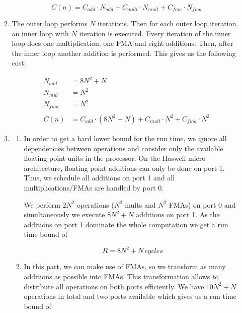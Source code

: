 \documentclass[a4paper]{article}
\begin{document}
\begin{enumerate}
\begin{enumerate}
        \begin{equation*}
        C(n) = C_{add} \cdot N_{add} + C_{mult} \cdot N_{mult} + C_{fma} \cdot N_{fma}
        \end{equation*}
        
        \item The outer loop performs $N$ iterations. Then for each outer loop iteration, an inner loop with $N$ iteration is executed. Every iteration of the inner loop does one multiplication, one FMA and eight additions. Then, after the inner loop another addition is performed. This gives us the following cost:
        
        \begin{align*}
            N_{add} &= 8N^2 + N \\
            N_{mul} &= N^2 \\
            N_{fma} &= N^2 \\ \\
            C(n) &= C_{add} \cdot (8N^2 + N) + C_{mult} \cdot N^2 + C_{fma} \cdot N^2
        \end{align*}
        
        \item 
        \begin{enumerate}
            \item In order to get a hard lower bound for the run time, we ignore all dependencies between operations and consider only the available floating point units in the processor. On the Haswell micro architecture, floating point additions can only be done on port 1. Thus, we schedule all additions on port 1 and all multiplications/FMAs are handled by port 0. 
            
            We perform $2N^2$ operations ($N^2$ mults and $N^2$ FMAs) on port 0 and simultaneously we execute $8N^2+N$ additions on port 1. As the additions on port 1 dominate the whole computation we get a run time bound of
            
            \begin{equation*}
                R = 8N^2+N \, cycles
            \end{equation*}
            
            \item In this part, we can make use of FMAs, so we transform as many additions as possible into FMAs. This transformation allows to distribute all operations on both ports efficiently. We have $10N^2+N$ operations in total and two ports available which gives us a run time bound of 
            

\end{enumerate}
\end{enumerate}
\end{enumerate}
\end{document}

